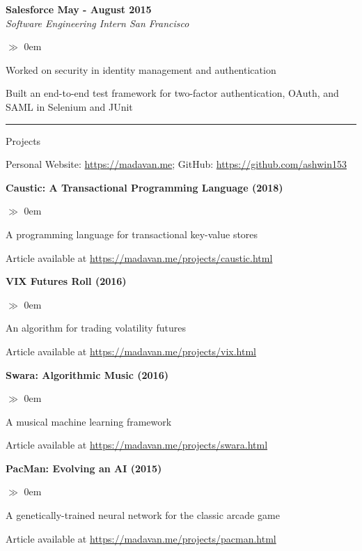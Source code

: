 \documentclass{article}
\begin{document}
\noindent\textbf{Salesforce \hfill{May - August 2015}}\\
\noindent\emph{Software Engineering Intern \hfill{San Francisco}}
\begin{list}{$\gg$}{}  
  \itemsep0em
  \item Worked on security in identity management and authentication
  \item Built an end-to-end test framework for two-factor authentication, OAuth, and SAML in Selenium and JUnit
\end{list}

\hrule\medskip
\centerline{\large \sc Projects}\smallskip 
\centerline{Personal Website: \url{https://madavan.me}; GitHub:
\url{https://github.com/ashwin153}}\medskip

\noindent\textbf{Caustic: A Transactional Programming Language (2018)}
\begin{list}{$\gg$}{}
  \itemsep0em
  \item A programming language for transactional key-value stores
  \item Article available at \url{https://madavan.me/projects/caustic.html}
\end{list}

\noindent\textbf{VIX Futures Roll (2016)}
\begin{list}{$\gg$}{}
  \itemsep0em
  \item An algorithm for trading volatility futures
  \item Article available at \url{https://madavan.me/projects/vix.html}
\end{list}

\noindent\textbf{Swara: Algorithmic Music (2016)}
\begin{list}{$\gg$}{}
  \itemsep0em
  \item A musical machine learning framework
  \item Article available at \url{https://madavan.me/projects/swara.html}
\end{list}

\noindent\textbf{PacMan: Evolving an AI (2015)}
\begin{list}{$\gg$}{}  
  \itemsep0em
	\item A genetically-trained neural network for the classic arcade game
	\item Article available at \url{https://madavan.me/projects/pacman.html}
\end{list}
\end{document}

